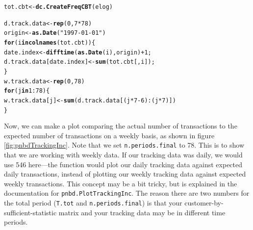 \documentclass[10pt, letterpaper, onecolumn, oneside, final]{article}\usepackage[]{graphicx}\usepackage[]{color}
\makeatletter
\newcommand{\hlnum}[1]{\textcolor[rgb]{0.686,0.059,0.569}{#1}}%
\newcommand{\hlstr}[1]{\textcolor[rgb]{0.192,0.494,0.8}{#1}}%
\newcommand{\hlopt}[1]{\textcolor[rgb]{0,0,0}{#1}}%
\newcommand{\hlstd}[1]{\textcolor[rgb]{0.345,0.345,0.345}{#1}}%
\newcommand{\hlkwa}[1]{\textcolor[rgb]{0.161,0.373,0.58}{\textbf{#1}}}%
\newcommand{\hlkwb}[1]{\textcolor[rgb]{0.69,0.353,0.396}{#1}}%
\newcommand{\hlkwd}[1]{\textcolor[rgb]{0.737,0.353,0.396}{\textbf{#1}}}%
\newenvironment{kframe}{%
 \def\at@end@of@kframe{}%
 \ifinner\ifhmode%
  \def\at@end@of@kframe{\end{minipage}}%
  \begin{minipage}{\columnwidth}%
 \fi\fi%
 \def\FrameCommand##1{\hskip\@totalleftmargin \hskip-\fboxsep
 \colorbox{shadecolor}{##1}\hskip-\fboxsep
     \hskip-\linewidth \hskip-\@totalleftmargin \hskip\columnwidth}%
 \MakeFramed {\advance\hsize-\width
   \@totalleftmargin\z@ \linewidth\hsize
   \@setminipage}}%
 {\par\unskip\endMakeFramed%
 \at@end@of@kframe}
\newenvironment{knitrout}{}{} %
\makeatother
\begin{document}
\begin{knitrout}
\color{fgcolor}\begin{kframe}
\begin{alltt}
\hlstd{tot.cbt} \hlkwb{<-} \hlkwd{dc.CreateFreqCBT}\hlstd{(elog)}
\end{alltt}


{\ttfamily\noindent\itshape\color{messagecolor}{\# ...Completed Freq CBT}}\begin{alltt}
\hlstd{d.track.data} \hlkwb{<-} \hlkwd{rep}\hlstd{(}\hlnum{0}\hlstd{,} \hlnum{7} \hlopt{*} \hlnum{78}\hlstd{)}
\hlstd{origin} \hlkwb{<-} \hlkwd{as.Date}\hlstd{(}\hlstr{"1997-01-01"}\hlstd{)}
\hlkwa{for} \hlstd{(i} \hlkwa{in} \hlkwd{colnames}\hlstd{(tot.cbt))\{}
  \hlstd{date.index} \hlkwb{<-} \hlkwd{difftime}\hlstd{(}\hlkwd{as.Date}\hlstd{(i), origin)} \hlopt{+} \hlnum{1}\hlstd{;}
  \hlstd{d.track.data[date.index]} \hlkwb{<-} \hlkwd{sum}\hlstd{(tot.cbt[,i]);}
\hlstd{\}}
\hlstd{w.track.data} \hlkwb{<-}  \hlkwd{rep}\hlstd{(}\hlnum{0}\hlstd{,} \hlnum{78}\hlstd{)}
\hlkwa{for} \hlstd{(j} \hlkwa{in} \hlnum{1}\hlopt{:}\hlnum{78}\hlstd{)\{}
  \hlstd{w.track.data[j]} \hlkwb{<-} \hlkwd{sum}\hlstd{(d.track.data[(j}\hlopt{*}\hlnum{7}\hlopt{-}\hlnum{6}\hlstd{)}\hlopt{:}\hlstd{(j}\hlopt{*}\hlnum{7}\hlstd{)])}
\hlstd{\}}
\end{alltt}
\end{kframe}
\end{knitrout}

Now, we can make a plot comparing the actual number of transactions to
the expected number of transactions on a weekly basis, as shown in
figure \ref{fig:pnbdTrackingInc}. Note that we set
\texttt{n.periods.final} to 78. This is to show that we are working
with weekly data. If our tracking data was daily, we would use 546
here---the function would plot our daily tracking data against
expected daily transactions, instead of plotting our weekly tracking
data against expected weekly transactions. This concept may be a bit
tricky, but is explained in the documentation for
\texttt{pnbd.PlotTrackingInc}. The reason there are two numbers for
the total period (\texttt{T.tot} and \texttt{n.periods.final}) is that
your customer-by-sufficient-statistic matrix and your tracking data
may be in different time periods.
\end{document}
